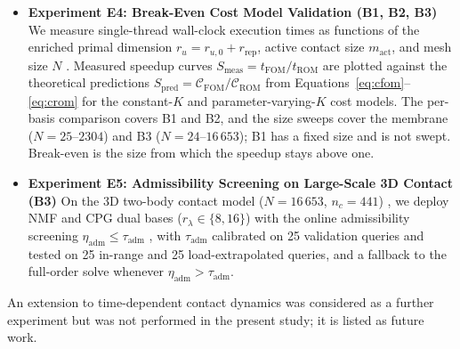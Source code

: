 \documentclass[11pt,a4paper]{article}
\providecommand{\tightlist}{\setlength{\itemsep}{0pt}\setlength{\parskip}{0pt}}
\begin{document}
\begin{itemize}
  \begin{enumerate}
  \def\labelenumi{\arabic{enumi}.}
  \tightlist
  \item
    Lifted energy-norm displacement error and multiplier \(\ell_2\)-error;
  \item
    Online admissibility violation \(\eta_{\text{adm}}\);
  \item
    Primal rank-repair enrichment \(r_{\text{rep}}\) required to bring \(\text{cond}(B_r K_r^{-1} B_r^T)\) to at most \(10^6\) (reached in all cases except three B1 entries, see the discussion of Algorithm~\ref{alg:repair}) \cite{leberre2022condition};
  \item
    Active-set iteration count \(k_{\text{ROM}}\) and online wall-clock time;
  \item
    Offline basis construction wall-clock time.
  \end{enumerate}
\item
  \textbf{Experiment E4: Break-Even Cost Model Validation (B1, B2, B3)}
  We measure single-thread wall-clock execution times as functions of the enriched primal dimension \(r_u = r_{u,0} + r_{\text{rep}}\), active contact size \(m_{\text{act}}\), and mesh size \(N\) \cite{franceschini2022block, leberre2022condition, pawar2025efficient}. Measured speedup curves \(S_{\text{meas}} = t_{\text{FOM}} / t_{\text{ROM}}\) are plotted against the theoretical predictions \(S_{\text{pred}} = \mathcal{C}_{\text{FOM}} / \mathcal{C}_{\text{ROM}}\) from Equations~\eqref{eq:cfom}--\eqref{eq:crom} for the constant-\(K\) and parameter-varying-\(K\) cost models. The per-basis comparison covers B1 and B2, and the size sweeps cover the membrane (\(N = 25\)--\(2304\)) and B3 (\(N = 24\)--\(16\,653\)); B1 has a fixed size and is not swept. Break-even is the size from which the speedup stays above one.
\item
  \textbf{Experiment E5: Admissibility Screening on Large-Scale 3D Contact (B3)}
  On the 3D two-body contact model (\(N = 16\,653\), \(n_c = 441\)) \cite{franceschini2022block, koller2021hyper}, we deploy NMF and CPG dual bases (\(r_\lambda \in \{8, 16\}\)) with the online admissibility screening \(\eta_{\text{adm}} \le \tau_{\text{adm}}\) \cite{dabaghi2020posteriori}, with \(\tau_{\text{adm}}\) calibrated on 25 validation queries and tested on 25 in-range and 25 load-extrapolated queries, and a fallback to the full-order solve whenever \(\eta_{\text{adm}} > \tau_{\text{adm}}\).
\end{itemize}

An extension to time-dependent contact dynamics was considered as a further experiment but was not performed in the present study; it is listed as future work.
\end{document}
